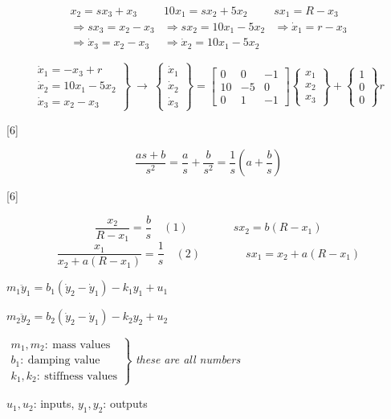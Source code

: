 \documentclass[11pt,a4paper]{article}
\begin{document}
\[
\begin{array}{lll}
x_2=sx_3+x_3 & 10x_1=sx_2+5x_2 & sx_1=R-x_3\\
\Rightarrow sx_3=x_2-x_3 & \Rightarrow sx_2=10x_1-5x_2 & \Rightarrow \dot{x}_1=r-x_3\\
\Rightarrow \dot{x}_3=x_2-x_3 & \Rightarrow \dot{x}_2=10x_1-5x_2 &
\end{array}
\]

\[
\left.\begin{array}{l}\dot{x}_1=-x_3+r\\ \dot{x}_2=10x_1-5x_2\\ \dot{x}_3=x_2-x_3\end{array}\right\}
\ \to\
\begin{Bmatrix}\dot{x}_1\\\dot{x}_2\\\dot{x}_3\end{Bmatrix}
=
\begin{bmatrix}0&0&-1\\10&-5&0\\0&1&-1\end{bmatrix}
\begin{Bmatrix}x_1\\x_2\\x_3\end{Bmatrix}
+
\begin{Bmatrix}1\\0\\0\end{Bmatrix}r
\]

[6]

\[
\frac{as+b}{s^2}=\frac{a}{s}+\frac{b}{s^2}=\frac{1}{s}\left(a+\frac{b}{s}\right)
\]

[6]

\[
\frac{x_2}{R-x_1}=\frac{b}{s}\quad(1)\qquad\qquad sx_2=b(R-x_1)
\]
\[
\frac{x_1}{x_2+a(R-x_1)}=\frac{1}{s}\quad(2)\qquad\qquad sx_1=x_2+a(R-x_1)
\]


\begin{ornek}
$m_1\ddot{y}_1=b_1(\dot{y}_2-\dot{y}_1)-k_1y_1+u_1$

$m_2\ddot{y}_2=b_2(\dot{y}_2-\dot{y}_1)-k_2y_2+u_2$

$\left.\begin{array}{l}
m_1,m_2:\ \text{mass values}\\
b_1:\ \text{damping value}\\
k_1,k_2:\ \text{stiffness values}
\end{array}\right\}$ \textit{these are all numbers}

$u_1,u_2$: inputs, \quad $y_1,y_2$: outputs
\end{ornek}
\end{document}
